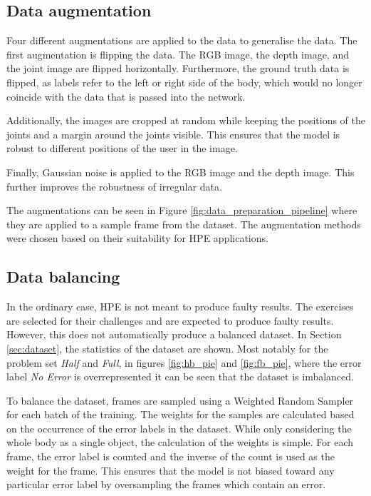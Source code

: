 \subsection{Data augmentation}

Four different augmentations are applied to the data to generalise the data. The first augmentation is flipping the data. The RGB image, the depth image, and the joint image are flipped horizontally. Furthermore, the ground truth data is flipped, as labels refer to the left or right side of the body, which would no longer coincide with the data that is passed into the network.

Additionally, the images are cropped at random while keeping the positions of the joints and a margin around the joints visible. This ensures that the model is robust to different positions of the user in the image. 

Finally, Gaussian noise is applied to the RGB image and the depth image. This further improves the robustness of irregular data.

The augmentations can be seen in Figure \ref{fig:data_preparation_pipeline} where they are applied to a sample frame from the dataset. The augmentation methods were chosen based on their suitability for HPE applications.

\subsection{Data balancing}

In the ordinary case, HPE is not meant to produce faulty results. The exercises are selected for their challenges and are expected to produce faulty results. However, this does not automatically produce a balanced dataset. In Section \ref{sec:dataset}, the statistics of the dataset are shown. Most notably for the problem set \textit{Half} and \textit{Full}, in figures \ref{fig:hb_pie} and \ref{fig:fb_pie}, where the error label \textit{No Error} is overrepresented it can be seen that the dataset is imbalanced.

To balance the dataset, frames are sampled using a Weighted Random Sampler for each batch of the training. The weights for the samples are calculated based on the occurrence of the error labels in the dataset. While only considering the whole body as a single object, the calculation of the weights is simple. For each frame, the error label is counted and the inverse of the count is used as the weight for the frame. This ensures that the model is not biased toward any particular error label by oversampling the frames which contain an error.

